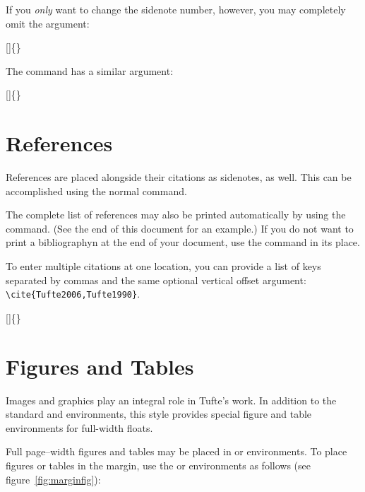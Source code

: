 If you \emph{only} want to change the sidenote number, however, you may
completely omit the  argument:
\begin{docspec}
  []\{\}
\end{docspec}

The  command has a similar  argument:
\begin{docspec}
  []\{\}
\end{docspec}

\section{References}
References are placed alongside their citations as sidenotes,
as well.  This can be accomplished using the normal 
command.

The complete list of references may also be printed automatically by using
the  command.  (See the end of this document for an
example.)  If you do not want to print a bibliographyn at the end of your
document, use the  command in its place.  

To enter multiple citations at one location,\cite[-3\baselineskip]{Tufte2006,Tufte1990} you can
provide a list of keys separated by commas and the same optional vertical
offset argument: \Verb|\cite{Tufte2006,Tufte1990}|.  
\begin{docspec}
  []\{\}
\end{docspec}

\section{Figures and Tables}\label{sec:figures-and-tables}
Images and graphics play an integral role in Tufte's work.
In addition to the standard  and  environments,
this style provides special figure and table environments for full-width
floats.

Full page--width figures and tables may be placed in  or
 environments.  To place figures or tables in the margin,
use the  or  environments as follows
(see figure~\ref{fig:marginfig}):


